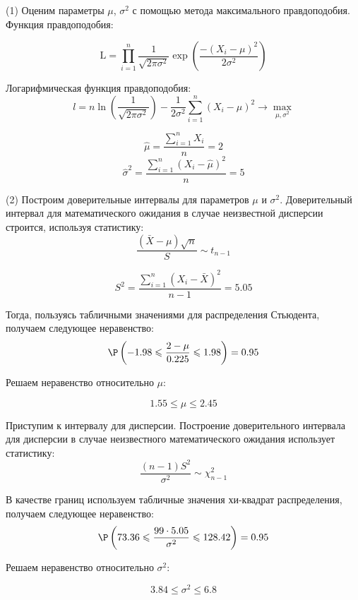 \documentclass[pdftex,11pt,openany]{book}\usepackage[]{graphicx}\usepackage[]{color}
\begin{document}
\begin{solution}
(1) Оценим параметры $\mu$, $\sigma^2$ с помощью метода максимального правдоподобия. Функция правдоподобия:

\[\text{L} = \prod_{i=1}^{n} \frac{1}{\sqrt{2\pi\sigma^2}}\exp\left( \frac{- \left( X_i-\mu\right)^2}{2\sigma^2}\right)\]

Логарифмическая функция правдоподобия:
\[l = n \ln\left(\frac{1}{\sqrt{2\pi\sigma^2}}\right) - \frac{1}{2\sigma^2}\sum_{i=1}^{n}\left(X_i-\mu\right)^2 \to \max_{\mu,\sigma^2}\]

\[\hat{\mu} = \frac{\sum_{i=1}^{n}X_i}{n} = 2\]
\[\hat{\sigma}^2 = \frac{\sum_{i=1}^{n}\left(X_i-\hat{\mu}\right)^2}{n} = 5\]

(2) Построим доверительные интервалы для параметров $\mu$ и $\sigma^2$. Доверительный интервал для математического ожидания в случае неизвестной дисперсии строится, используя статистику:
\[\frac{\left(\bar{X} - \mu\right)\sqrt{n}}{S} \sim t_{n-1}\]

\[S^2 = \frac{\sum_{i=1}^{n}\left( X_i - \bar{X}\right)^2 }{n-1} = 5.05\]

Тогда, пользуясь табличными значениями для распределения Стьюдента, получаем следующее неравенство:
\[\P\left( -1.98 \leqslant \frac{2-\mu}{0.225} \leqslant 1.98 \right) = 0.95 \]

Решаем неравенство относительно $\mu$:

\[1.55 \leqslant \mu \leqslant 2.45\]


Приступим к интервалу для дисперсии. Построение доверительного интервала для дисперсии в случае неизвестного математического ожидания использует статистику:
\[\frac{\left(n-1\right)S^2}{\sigma^2} \sim \chi^2_{n-1}\]

В качестве границ используем табличные значения хи-квадрат распределения, получаем следующее неравенство:
\[\P\left( 73.36 \leqslant \frac{99\cdot5.05}{\sigma^2} \leqslant 128.42 \right) = 0.95 \]

Решаем неравенство относительно $\sigma^2$:

\[3.84 \leqslant \sigma^2 \leqslant 6.8\]

\end{solution}
\end{document}
